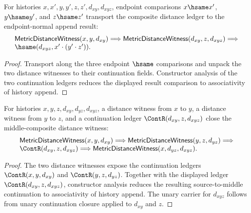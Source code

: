 \begin{theorem}
\label{thm:metric-distance-witness-composite-endpoint-hsame-append-result}
For histories $x,x',y,y',z,z',d_{xy},d_{xyz}$, endpoint comparisons
$x\hsame x'$, $y\hsame y'$, and $z\hsame z'$ transport the composite distance
ledger to the endpoint-normal append result:
$$
\begin{array}{l}
\mathsf{MetricDistanceWitness}(x,y,d_{xy})\Longrightarrow
\mathsf{MetricDistanceWitness}(d_{xy},z,d_{xyz})\Longrightarrow
\\
\hsame(d_{xyz},x'\cdot(y'\cdot z')).
\end{array}
$$
\end{theorem}
\begin{proof}
Transport along the three endpoint $\hsame$ comparisons and unpack the two
distance witnesses to their continuation fields. Constructor analysis of the
two continuation ledgers reduces the displayed result comparison to
associativity of history append.
\end{proof}

\begin{theorem}
\label{thm:metric-distance-witness-triangle-cont-middle-closed}
For histories $x,y,z,d_{xy},d_{yz},d_{xyz}$, a distance witness from $x$ to
$y$, a distance witness from $y$ to $z$, and a continuation ledger
$\ContR(d_{xy},z,d_{xyz})$ close the middle-composite distance witness:
$$
\begin{array}{l}
\mathsf{MetricDistanceWitness}(x,y,d_{xy})\Longrightarrow
\mathsf{MetricDistanceWitness}(y,z,d_{yz})\Longrightarrow
\\
\ContR(d_{xy},z,d_{xyz})\Longrightarrow
\mathsf{MetricDistanceWitness}(x,d_{yz},d_{xyz}).
\end{array}
$$
\end{theorem}
\begin{proof}
The two distance witnesses expose the continuation ledgers
$\ContR(x,y,d_{xy})$ and $\ContR(y,z,d_{yz})$. Together with the displayed
ledger $\ContR(d_{xy},z,d_{xyz})$, constructor analysis reduces the resulting
source-to-middle continuation to associativity of history append. The unary
carrier for $d_{xyz}$ follows from unary continuation closure applied to
$d_{xy}$ and $z$.
\end{proof}

